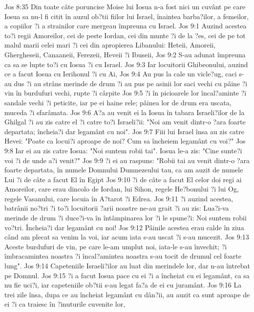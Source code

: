 Jos 8:35  Din toate câte poruncise Moise lui Iosua n-a fost nici un cuvânt pe care Iosua sa nu-l fi citit în auzul ob?tii fiilor lui Israel, înaintea barba?ilor, a femeilor, a copiilor ?i a strainilor care mergeau împreuna cu Israel.
Jos 9:1  Auzind acestea to?i regii Amoreilor, cei de peste Iordan, cei din munte ?i de la ?es, cei de pe tot malul marii celei mari ?i cei din apropierea Libanului: Heteii, Amoreii, Ghergheseii, Canaaneii, Ferezeii, Heveii ?i Ibuseii,
Jos 9:2  S-au adunat împreuna ca sa se lupte to?i cu Iosua ?i cu Israel.
Jos 9:3  Iar locuitorii Ghibeonului, auzind ce a facut Iosua cu Ierihonul ?i cu Ai,
Jos 9:4  Au pus la cale un vicle?ug, caci s-au dus ?i au strâns merinde de drum ?i au pus pe asinii lor saci vechi cu pâine ?i vin în burdufuri vechi, rupte ?i cârpite
Jos 9:5  ?i în picioarele lor încal?aminte ?i sandale vechi ?i peticite, iar pe ei haine rele; pâinea lor de drum era uscata, muceda ?i sfarâmata.
Jos 9:6  A?a au venit ei la Iosua în tabara Israeli?ilor de la Ghilgal ?i au zis catre el ?i catre to?i Israeli?ii: "Noi am venit dintr-o ?ara foarte departata; încheia?i dar legamânt cu noi".
Jos 9:7  Fiii lui Israel însa au zis catre Hevei: "Poate ca locui?i aproape de noi? Cum sa încheiem legamânt cu voi?"
Jos 9:8  Iar ei au zis catre Iosua: "Noi suntem robii tai". Iosua le-a zis: "Cine sunte?i voi ?i de unde a?i venit?"
Jos 9:9  ?i ei au raspuns: "Robii tai au venit dintr-o ?ara foarte departata, în numele Domnului Dumnezeului tau, ca am auzit de numele Lui ?i de câte a facut El în Egipt
Jos 9:10  ?i de câte a facut El celor doi regi ai Amoreilor, care erau dincolo de Iordan, lui Sihon, regele He?bonului ?i lui Og, regele Vasanului, care locuia în A?tarot ?i Edrea.
Jos 9:11  ?i auzind acestea, batrânii no?tri ?i to?i locuitorii ?arii noastre ne-au grait ?i au zis: Lua?i-va merinde de drum ?i duce?i-va în întâmpinarea lor ?i le spune?i: Noi suntem robii vo?tri. Încheia?i dar legamânt cu noi!
Jos 9:12  Pâinile acestea erau calde în ziua când am plecat sa venim la voi, iar acum iata s-au uscat ?i s-au mucezit.
Jos 9:13  Aceste burdufuri de vin, pe care le-am umplut noi, iata-le s-au învechit; ?i îmbracamintea noastra ?i încal?amintea noastra s-au tocit de drumul cel foarte lung".
Jos 9:14  Capeteniile Israeli?ilor au luat din merindele lor, dar n-au întrebat pe Domnul.
Jos 9:15  ?i a facut Iosua pace cu ei ?i a încheiat cu ei legamânt, ca sa nu fie uci?i, iar capeteniile ob?tii s-au legat fa?a de ei cu juramânt.
Jos 9:16  La trei zile însa, dupa ce au încheiat legamânt cu dân?ii, au auzit ca sunt aproape de ei ?i ca traiesc în ?inuturile cuvenite lor,
